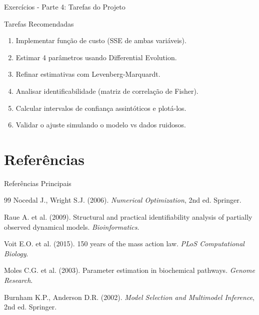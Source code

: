 \begin{frame}{Exercícios - Parte 4: Tarefas do Projeto}
\begin{alertblock}{Tarefas Recomendadas}
\begin{enumerate}
    \item Implementar função de custo (SSE de ambas variáveis).
    \item Estimar 4 parâmetros usando Differential Evolution.
    \item Refinar estimativas com Levenberg-Marquardt.
    \item Analisar identificabilidade (matriz de correlação de Fisher).
    \item Calcular intervalos de confiança assintóticos e plotá-los.
    \item Validar o ajuste simulando o modelo vs dados ruidosos.
\end{enumerate}
\end{alertblock}
\end{frame}

\section{Referências}

\begin{frame}{Referências Principais}
\begin{thebibliography}{99}
 Nocedal J., Wright S.J. (2006). \textit{Numerical Optimization}, 2nd ed. Springer.

 Raue A. et al. (2009). Structural and practical identifiability analysis of partially observed dynamical models. \textit{Bioinformatics}.

 Voit E.O. et al. (2015). 150 years of the mass action law. \textit{PLoS Computational Biology}.

 Moles C.G. et al. (2003). Parameter estimation in biochemical pathways. \textit{Genome Research}.

 Burnham K.P., Anderson D.R. (2002). \textit{Model Selection and Multimodel Inference}, 2nd ed. Springer.
\end{thebibliography}
\end{frame}

